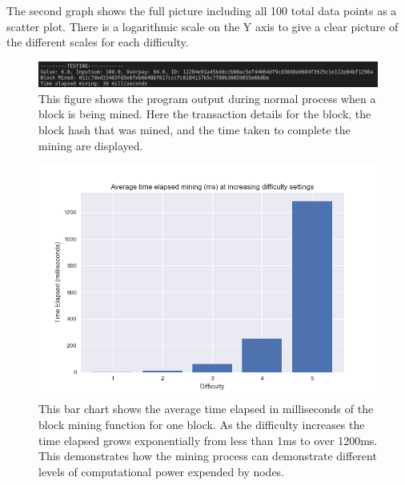 \documentclass{l4proj}
\begin{document}
The second graph shows the full picture including all 100 total data points as a scatter plot. There is a logarithmic
scale on the Y axis to give a clear picture of the different scales for each difficulty.

\begin{figure}[!ht]
    \centering
    \includegraphics[width=1\linewidth]{images/check2.png}    
    \caption
    {
        This figure shows the program output during normal process when a block is being mined. Here the transaction
        details for the block, the block hash that was mined, and the time taken to complete the mining are displayed.
    }
    \label{fig:check2} 
\end{figure}

\begin{figure}[!ht]
    \centering
    \includegraphics[width=1\linewidth]{images/avgBar.png}    
    \caption
    {
        This bar chart shows the average time elapsed in milliseconds of the block mining function for one block.
        As the difficulty increases the time elapsed grows exponentially from less than 1ms to over 1200ms. This
        demonstrates how the mining process can demonstrate different levels of computational power expended by
        nodes.
    }
    \label{fig:avgBar} 
\end{figure}
\end{document}
